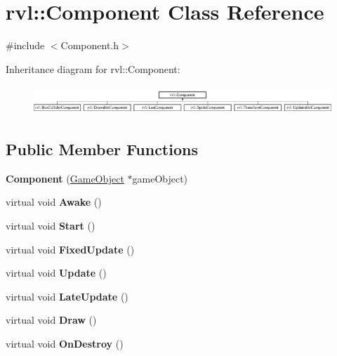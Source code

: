 \hypertarget{classrvl_1_1_component}{}\section{rvl\+:\+:Component Class Reference}
\label{classrvl_1_1_component}


{\ttfamily \#include $<$Component.\+h$>$}

Inheritance diagram for rvl\+:\+:Component\+:\begin{figure}[H]
\begin{center}
\leavevmode
\includegraphics[height=1.104536cm]{classrvl_1_1_component}
\end{center}
\end{figure}
\subsection*{Public Member Functions}
\begin{DoxyCompactItemize}
\item 
\mbox{\label{classrvl_1_1_component_a02543b5e898aca9f2b8e7f22885c4d11}} 
{\bfseries Component} (\hyperlink{classrvl_1_1_game_object}{Game\+Object} $\ast$game\+Object)
\item 
\mbox{\label{classrvl_1_1_component_ab3787b6c95a6947f9f505731ff90b6b0}} 
virtual void {\bfseries Awake} ()
\item 
\mbox{\label{classrvl_1_1_component_a1a34ed844d83bb8154d5f8568c91fd96}} 
virtual void {\bfseries Start} ()
\item 
\mbox{\label{classrvl_1_1_component_a57c647d243e285b6f61060e2705d8681}} 
virtual void {\bfseries Fixed\+Update} ()
\item 
\mbox{\label{classrvl_1_1_component_ac09aa613068226b7538ef78a1280189f}} 
virtual void {\bfseries Update} ()
\item 
\mbox{\label{classrvl_1_1_component_a18215b1b481520a8b15a5a5bddc8d0ee}} 
virtual void {\bfseries Late\+Update} ()
\item 
\mbox{\label{classrvl_1_1_component_a6b290654f9cbd131b93741f136cfc53a}} 
virtual void {\bfseries Draw} ()
\item 
\mbox{\label{classrvl_1_1_component_af361ff6a51f52630b4a7abb375fd4f1e}} 
virtual void {\bfseries On\+Destroy} ()
\end{DoxyCompactItemize}

